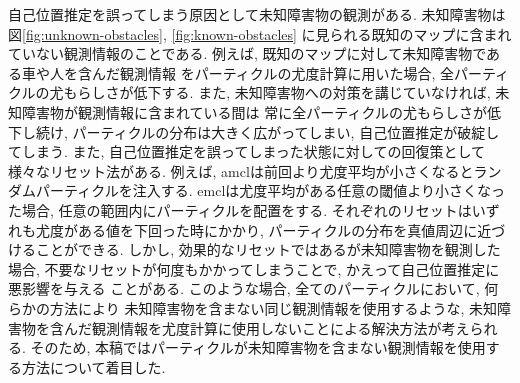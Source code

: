 自己位置推定を誤ってしまう原因として未知障害物の観測がある. 
未知障害物は図\ref{fig:unknown-obstacles}, \ref{fig:known-obstacles}
に見られる既知のマップに含まれていない観測情報のことである. 
例えば, 既知のマップに対して未知障害物である車や人を含んだ観測情報
をパーティクルの尤度計算に用いた場合, 全パーティクルの尤もらしさが低下する. 
また, 未知障害物への対策を講じていなければ, 未知障害物が観測情報に含まれている間は
常に全パーティクルの尤もらしさが低下し続け, パーティクルの分布は大きく広がってしまい, 
自己位置推定が破綻してしまう. また, 自己位置推定を誤ってしまった状態に対しての回復策として
様々なリセット法がある. 
例えば, amclは前回より尤度平均が小さくなるとランダムパーティクルを注入する. 
emclは尤度平均がある任意の閾値より小さくなった場合, 
任意の範囲内にパーティクルを配置をする\cite{ueda2004iros}. 
それぞれのリセットはいずれも尤度がある値を下回った時にかかり, 
パーティクルの分布を真値周辺に近づけることができる. 
しかし, 効果的なリセットではあるが未知障害物を観測した場合, 
不要なリセットが何度もかかってしまうことで, かえって自己位置推定に悪影響を与える
ことがある. 
このような場合, 全てのパーティクルにおいて, 何らかの方法により
未知障害物を含まない同じ観測情報を使用するような, 
未知障害物を含んだ観測情報を尤度計算に使用しないことによる解決方法が考えられる. 
そのため, 本稿ではパーティクルが未知障害物を含まない観測情報を使用する方法について着目した. 

